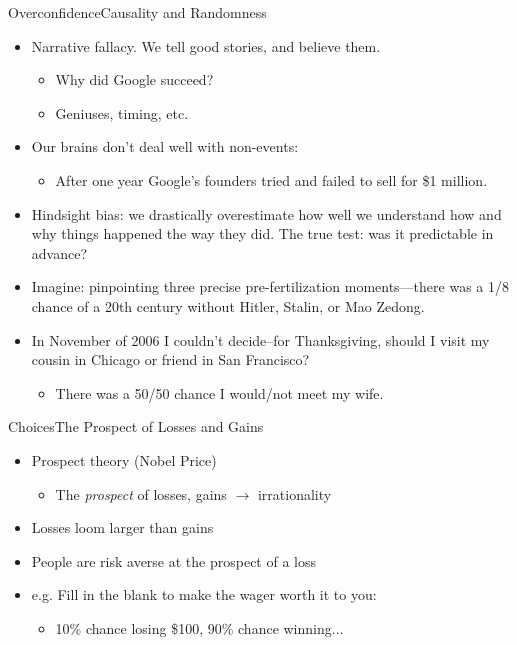 \documentclass{beamer}
\begin{document}
\begin{frame}{Overconfidence}{Causality and Randomness}
\begin{itemize}
\addtolength{\itemsep}{0.5\baselineskip}
\item Narrative fallacy. We tell good stories, and believe them.
  \begin{itemize}
  \addtolength{\itemsep}{0.5\baselineskip}
  \item Why did Google succeed?
  \item Geniuses, timing, etc.
  \end{itemize}
\item Our brains don't deal well with non-events: 
  \begin{itemize}
  \item After one year Google's founders tried and failed to sell for \$1 million.
  \end{itemize}
\item Hindsight bias: we drastically overestimate how well we understand how and why things happened the way they did. The true test: was it predictable in advance?
\item Imagine: pinpointing three precise pre-fertilization moments---there was a 1/8 chance of a 20th century without Hitler, Stalin, or Mao Zedong. 
\item In November of 2006 I couldn't decide--for Thanksgiving, should I visit my cousin in Chicago or friend in San Francisco?
  \begin{itemize}
  \item There was a 50/50 chance I would/not meet my wife.
  \end{itemize}
\end{itemize}
\end{frame}

\begin{frame}{Choices}{The Prospect of Losses and Gains}
  \begin{itemize}
  \addtolength{\itemsep}{0.5\baselineskip}
  \item Prospect theory (Nobel Price) 
        \begin{itemize}
        \item The {\it prospect} of losses, gains $\rightarrow$ irrationality
        \end{itemize}
  \item Losses loom larger than gains
  \item People are risk averse at the prospect of a loss
  \item e.g. Fill in the blank to make the wager worth it to you:
        \begin{itemize}
        \item 10\% chance losing \$100, 90\% chance winning...
        \end{itemize}
  \end{itemize}
\end{frame}
\end{document}
